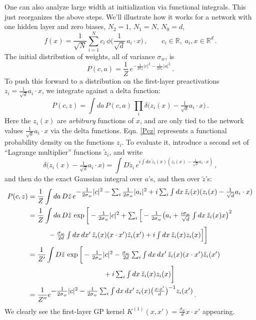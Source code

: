 \documentclass[11pt]{article}
\newcommand{\R}{\mathbb{R}}
\begin{document}
One can also analyze large width at initialization via functional integrals. This just reorganizes the above steps. We'll illustrate how it works for a network with one hidden layer and zero biases, $N_2=1,\,N_1=N,\,N_0=d$,
%
\begin{equation}
    f(x) = \frac{1}{\sqrt N}\sum_{i=1}^N c_i\,\phi\Big(\frac{1}{\sqrt d}\,a_i\cdot x\Big)\,,\qquad c_i\in \R,\;a_i,x\in \R^d\,.
\end{equation}
%
The initial distribution of weights, all of variance $\sigma_w$, is
%
\begin{equation}
    P(c,a) = \frac{1}{Z}\,e^{\textstyle -\frac{1}{2\sigma_w}|c|^2-\frac{1}{2\sigma_w}|a|^2}\,.
\end{equation}
%
To push this forward to a distribution on the first-layer preactivations $z_i=\frac{1}{\sqrt d}a_i\cdot x$, we integrate against a delta function:
%
\begin{equation}
   P(c,z)= \int da\, P(c,a)\,\prod_i\delta\Big(z_i(x)-\tfrac{1}{\sqrt d}a_i\cdot x\Big)\,. \label{Pcz}
\end{equation}
%
Here the $z_i(x)$ are \emph{arbitrary} functions of $x$, and are only tied to the network values $\frac{1}{\sqrt d}a_i\cdot x$ via the delta functions. Eqn. \eqref{Pcz} represents a functional probability density on the functions $z_i$. To evaluate it, introduce a second set of ``Lagrange multiplier'' functions $\tilde z_i$, and write
%
\begin{equation}
    \delta\Big(z_i(x)-\tfrac{1}{\sqrt d}a_i\cdot x\Big) = \int D\tilde z_i\,  e^{\textstyle i \int dx\, \tilde z_i(x) (z_i(x)-\frac{1}{\sqrt d}a_i\cdot x)}\,,
\end{equation}
%
and then do the exact Gaussian integral over $a$'s, and then over $\tilde z$'s:
%
\begin{align}
    P(c,z) &= \frac{1}{Z} \int da\,D\tilde z\, e^{\textstyle -\frac{1}{2\sigma_w}|c|^2-\sum_i \frac{1}{2\sigma_w} |a_i|^2 + i \sum_i \int dx\, \tilde z_i(x)(z_i(x)-\frac{1}{\sqrt d}a_i\cdot x)} \\
     &= \frac{1}{Z} \int da\,D\tilde z\, \exp\bigg[\textstyle -\frac{1}{2\sigma_w}|c|^2+\sum_i\Big[- \frac{1}{2\sigma_w} \big(a_i+\frac{i\sigma_w}{\sqrt d}\int dx\,\tilde z_i(x) x\big)^2 \notag \\
     & \hspace{.4in} \textstyle-\frac{\sigma_w}{2d}\int dx\,dx'\, \tilde z_i(x) (x\cdot x') \tilde z_i(x') + i  \int dx\, \tilde z_i(x)z_i(x)\Big]\bigg] \\
     & = \frac{1}{Z'} \int D\tilde z\,\exp\bigg[\textstyle -\frac{1}{2\sigma_w}|c|^2-\frac{\sigma_w}{2d}\sum_i\int dx\,dx'\, \tilde z_i(x) (x\cdot x') \tilde z_i(x') \notag \\
     & \hspace{1.5in} \textstyle + i  \sum_i\int dx\, \tilde z_i(x)z_i(x)\bigg] \\
     & = \frac{1}{Z''} e^{\textstyle  -\frac{1}{2\sigma_w}|c|^2 - \frac{1}{2\sigma_w} \sum_i \int dx\,dx'\, z_i(x) \big(\frac{x\cdot x'}{d}\big)^{-1}z_i(x')}\,.
\end{align}
%
We clearly see the first-layer GP kernel $K^{(1)}(x,x') = \frac{\sigma_w}{d} x\cdot x'$ appearing.
\end{document}
